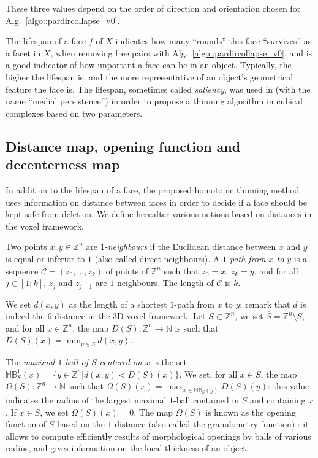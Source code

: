 \documentclass[final,envcountsame]{llncs}
\def\OneBall#1{\mathbb{B}^{1}_{#1}}
\def\MaxOneBall#1{\mathbb{M}\OneBall{#1}}
\def\mydist1{D}
\def\mydd1{\Omega}
\def\dist1{d}
\def\Dist1#1{\mydist1(#1)}
\def\DD1#1{\mydd1(#1)}
\def\myem#1{{\em #1}}
\def\quotes#1{``#1''}
\def\Nset{\mathbb{N}}
\def\Zset{\Z}
\def\Nset{\mathbb{N}}
\def\Z{\mathbb{Z}}
\newcommand{\Compl}[1]{\overline{#1}}
\begin{document}
These three values depend on the order of direction and orientation chosen for Alg.~\ref{algo::pardircollapse_v0}.

The lifespan of a face $f$ of $X$ indicates how many \quotes{rounds} this face \quotes{survives} as a facet in $X$, when removing free pairs with Alg.~\ref{algo::pardircollapse_v0}, and is a good indicator of how important a face can be in an object. Typically, the higher the lifespan is, and the more representative of an object's geometrical feature the face is. The lifespan, sometimes called \myem{saliency}, was used in \cite{Liu2009} (with the name \quotes{medial persistence}) in order to propose a thinning algorithm in cubical complexes based on two parameters.



\subsection{Distance map, opening function and decenterness map}
\label{subsec::distmap}
In addition to the lifespan of a face, the proposed homotopic thinning method uses information on distance between faces in order to decide if a face should be kept safe from deletion. We define hereafter various notions based on distances in the voxel framework.

Two points $x,y \in \Zset^n$ are \myem{$1$-neighbours} if the Euclidean distance between $x$ and $y$ is equal or inferior to $1$ (also called direct neighbours). A \myem{$1$-path from $x$ to $y$} is a sequence $\mathcal{C}=(z_0,...,z_k)$ of points of $\Zset^n$ such that $z_0=x$, $z_k=y$, and for all $j \in [1;k]$, $z_j$ and $z_{j-1}$ are $1$-neighbours. The length of $\mathcal{C}$ is $k$. 

We set $\dist1(x,y)$ as the length of a shortest $1$-path from $x$ to $y$; remark that $\dist1$ is indeed the $6$-distance in the 3D voxel framework. Let $S \subset \Zset^n$, we set $\Compl{S} = \Zset^n \setminus S$, and for all $x \in \Zset^n$, the map $\Dist1{S}: \Zset^n \rightarrow \Nset$ is such that $\Dist1{S}(x) = \displaystyle \min_{y \in \Compl{S}} \dist1(x,y)$. 

The \myem{maximal $1$-ball of $S$ centered on $x$} is the set $\MaxOneBall{S}(x)=\{y \in \Zset^n | \dist1(x,y) < \Dist1{S}(x)\}$.
We set, for all $x \in S$, the map $\DD1{S}: \Zset^n \rightarrow \Nset$ such that $\DD1{S}(x) = \displaystyle \max_{x \in \MaxOneBall{S}(y)} \Dist1{S}(y)$: this value indicates the radius of the largest maximal $1$-ball contained in $S$ and containing $x$. If $x \in \Compl{S}$, we set $\DD1{S}(x) = 0$. The map $\DD1{S}$ is known as the opening function of $S$ based on the $1$-distance (also called the granulometry function) \cite{Matheron67}: it allows to compute efficiently results of morphological openings by balls of various radius, and gives information on the local thickness of an object.
\end{document}
